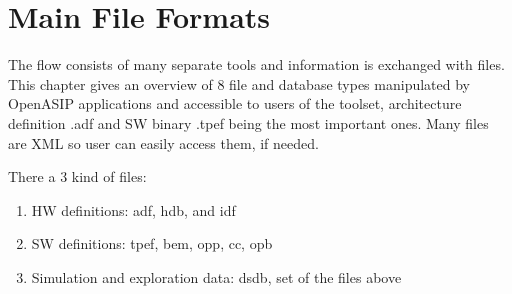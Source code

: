 \documentclass[a4paper,twoside]{tceusermanual}
\begin{document}
\section{Main File Formats}
\label{section:fileFormats}

The flow consists of many separate tools and information is exchanged
with files.  This chapter gives an overview of 8 file and database
types manipulated by OpenASIP applications and accessible to users of the
toolset, architecture definition .adf and SW binary
.tpef being the most important ones. Many files are XML so
user can easily access them, if needed.

There a 3 kind of files:

\begin{enumerate}
 \item HW definitions: adf, hdb, and idf
 \item SW definitions: tpef, bem, opp, cc, opb
 \item Simulation and exploration data: dsdb, set of the files above
\end{enumerate}





\end{document}
